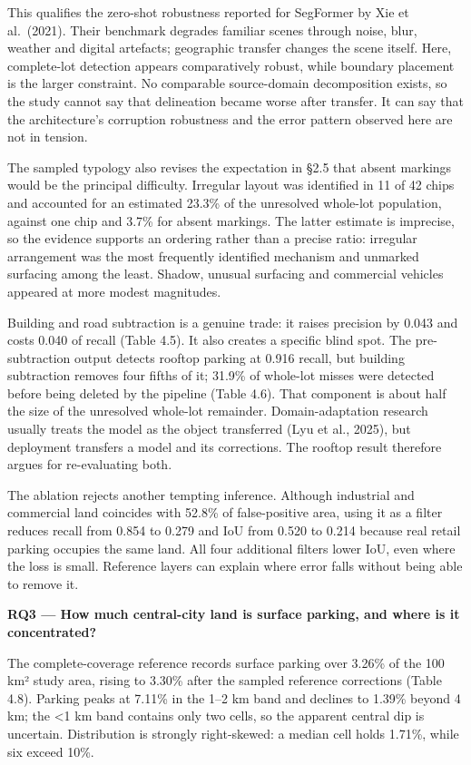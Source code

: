 This qualifies the zero-shot robustness reported for SegFormer by Xie et al.~(2021). Their benchmark degrades familiar scenes through noise, blur, weather and digital artefacts; geographic transfer changes the scene itself. Here, complete-lot detection appears comparatively robust, while boundary placement is the larger constraint. No comparable source-domain decomposition exists, so the study cannot say that delineation became worse after transfer. It can say that the architecture's corruption robustness and the error pattern observed here are not in tension.

The sampled typology also revises the expectation in §2.5 that absent markings would be the principal difficulty. Irregular layout was identified in 11 of 42 chips and accounted for an estimated 23.3\% of the unresolved whole-lot population, against one chip and 3.7\% for absent markings. The latter estimate is imprecise, so the evidence supports an ordering rather than a precise ratio: irregular arrangement was the most frequently identified mechanism and unmarked surfacing among the least. Shadow, unusual surfacing and commercial vehicles appeared at more modest magnitudes.

Building and road subtraction is a genuine trade: it raises precision by 0.043 and costs 0.040 of recall (Table 4.5). It also creates a specific blind spot. The pre-subtraction output detects rooftop parking at 0.916 recall, but building subtraction removes four fifths of it; 31.9\% of whole-lot misses were detected before being deleted by the pipeline (Table 4.6). That component is about half the size of the unresolved whole-lot remainder. Domain-adaptation research usually treats the model as the object transferred (Lyu et al., 2025), but deployment transfers a model and its corrections. The rooftop result therefore argues for re-evaluating both.

The ablation rejects another tempting inference. Although industrial and commercial land coincides with 52.8\% of false-positive area, using it as a filter reduces recall from 0.854 to 0.279 and IoU from 0.520 to 0.214 because real retail parking occupies the same land. All four additional filters lower IoU, even where the loss is small. Reference layers can explain where error falls without being able to remove it.

\textbf{RQ3 --- How much central-city land is surface parking, and where is it concentrated?}

The complete-coverage reference records surface parking over 3.26\% of the 100 km² study area, rising to 3.30\% after the sampled reference corrections (Table 4.8). Parking peaks at 7.11\% in the 1--2 km band and declines to 1.39\% beyond 4 km; the \textless1 km band contains only two cells, so the apparent central dip is uncertain. Distribution is strongly right-skewed: a median cell holds 1.71\%, while six exceed 10\%.

